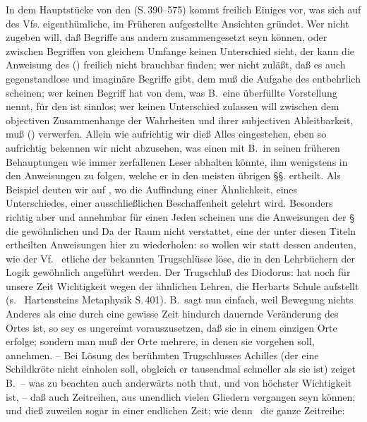 In dem Hauptstücke von den  (S.\,390--575) kommt freilich Einiges vor, was sich auf des Vfs. eigenthümliche, im Früheren aufgestellte Ansichten gründet. Wer nicht zugeben will, daß Begriffe aus andern zusammengesetzt seyn können, oder zwischen Begriffen von gleichem Umfange keinen Unterschied sieht, der kann die Anweisung des  () freilich nicht brauchbar finden; wer nicht zuläßt, daß es auch gegenstandlose und imaginäre Begriffe gibt, dem muß die Aufgabe des  entbehrlich scheinen; wer keinen Begriff hat von dem, was B.\ eine überfüllte Vorstellung nennt, für den ist  sinnlos; wer keinen Unterschied zulassen will zwischen dem objectiven Zusammenhange der Wahrheiten und ihrer subjectiven Ableitbarkeit, muß  () verwerfen. Allein wie aufrichtig wir dieß Alles eingestehen, eben so aufrichtig bekennen wir nicht abzusehen, was einen mit B.\ in seinen früheren Behauptungen wie immer zerfallenen Leser abhalten könnte, ihm wenigstens in den Anweisungen zu folgen, welche er in den meisten übrigen §§. ertheilt. Als Beispiel deuten wir auf , wo die Auffindung einer Ähnlichkeit, eines Unterschiedes, einer ausschließlichen Beschaffenheit gelehrt wird. Besonders richtig aber und annehmbar für einen Jeden scheinen uns die Anweisungen der §   die gewöhnlichen  und  Da der Raum nicht verstattet, eine der unter diesen Titeln ertheilten Anweisungen hier zu wiederholen: so wollen wir statt dessen andeuten, wie der Vf.\  etliche der bekannten Trugschlüsse löse, die in den Lehrbüchern der Logik gewöhnlich angeführt werden. Der Trugschluß des Diodorus:  hat noch für unsere  Zeit Wichtigkeit wegen der ähnlichen Lehren, die Herbarts Schule aufstellt (s. \zB\ Hartensteins Metaphysik S.\,401). B.\ sagt nun einfach, weil Bewegung nichts Anderes als eine durch eine gewisse Zeit hindurch dauernde Veränderung des Ortes ist, so sey es ungereimt vorauszusetzen, daß sie in einem einzigen Orte erfolge; sondern man muß der Orte mehrere, in denen sie vorgehen soll, annehmen. -- Bei Lösung des berühmten Trugschlusses Achilles (der eine Schildkröte nicht einholen soll, obgleich er tausendmal schneller als sie ist) zeiget B.\ -- was zu beachten auch anderwärts noth thut, und von höchster Wichtigkeit ist, -- daß auch Zeitreihen, aus unendlich vielen Gliedern vergangen seyn können; und dieß zuweilen sogar in einer endlichen Zeit; wie denn \zB\ die ganze Zeitreihe: \par 

